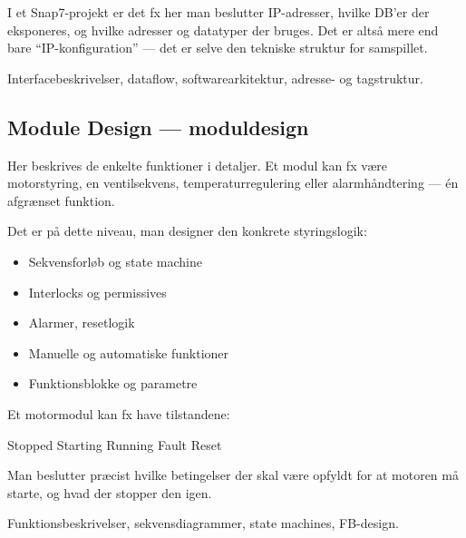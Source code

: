 \documentclass[12pt, a4paper]{article}
\begin{document}
I et Snap7-projekt er det fx her man beslutter IP-adresser, hvilke DB'er der eksponeres, og hvilke adresser og datatyper der bruges.
Det er altså mere end bare ``IP-konfiguration'' --- det er selve den tekniske struktur for samspillet.

\begin{tcolorbox}[tipbox, title={\faCheckSquare\quad Output fra fasen}]
Interfacebeskrivelser, dataflow, softwarearkitektur, adresse- og tagstruktur.
\end{tcolorbox}

\subsection{Module Design --- moduldesign}

Her beskrives de enkelte funktioner i detaljer.
Et modul kan fx være motorstyring, en ventilsekvens, temperaturregulering eller alarmhåndtering --- én afgrænset funktion.

Det er på dette niveau, man designer den konkrete styringslogik:

\begin{itemize}[leftmargin=1.5em, itemsep=2pt]
  \item Sekvensforløb og state machine
  \item Interlocks og permissives
  \item Alarmer, resetlogik
  \item Manuelle og automatiske funktioner
  \item Funktionsblokke og parametre
\end{itemize}

Et motormodul kan fx have tilstandene:

\begin{center}
\begin{tcolorbox}[
  enhanced,
  colback=lightgray,
  colframe=primaryblue,
  arc=3pt,
  boxrule=0.8pt,
  width=10cm,
]
\centering\ttfamily
Stopped \textrightarrow{} Starting \textrightarrow{} Running \textrightarrow{} Fault \textrightarrow{} Reset
\end{tcolorbox}
\end{center}

Man beslutter præcist hvilke betingelser der skal være opfyldt for at motoren må starte, og hvad der stopper den igen.

\begin{tcolorbox}[tipbox, title={\faCheckSquare\quad Output fra fasen}]
Funktionsbeskrivelser, sekvensdiagrammer, state machines, FB-design.
\end{tcolorbox}
\end{document}
